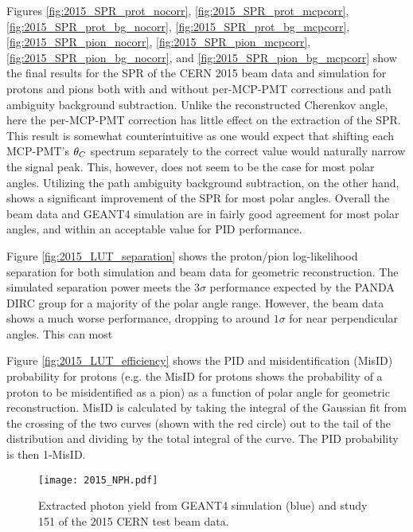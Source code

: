 Figures \ref{fig:2015_SPR_prot_nocorr}, \ref{fig:2015_SPR_prot_mcpcorr}, \ref{fig:2015_SPR_prot_bg_nocorr}, \ref{fig:2015_SPR_prot_bg_mcpcorr}, \ref{fig:2015_SPR_pion_nocorr}, \ref{fig:2015_SPR_pion_mcpcorr}, \ref{fig:2015_SPR_pion_bg_nocorr}, and \ref{fig:2015_SPR_pion_bg_mcpcorr} show the final results for the SPR of the CERN 2015 beam data and simulation for protons and pions both with and without per-MCP-PMT corrections and path ambiguity background subtraction. Unlike the reconstructed Cherenkov angle, here the per-MCP-PMT correction has little effect on the extraction of the SPR. This result is somewhat counterintuitive as one would expect that shifting each MCP-PMT's $\theta_{C}$ spectrum separately to the correct value would naturally narrow the signal peak. This, however, does not seem to be the case for most polar angles. Utilizing the path ambiguity background subtraction, on the other hand, shows a significant improvement of the SPR for most polar angles. Overall the beam data and GEANT4 simulation are in fairly good agreement for most polar angles, and within an acceptable value for PID performance.

Figure \ref{fig:2015_LUT_separation} shows the proton/pion log-likelihood separation for both simulation and beam data for geometric reconstruction. The simulated separation power meets the $3\sigma$ performance expected by the PANDA DIRC group for a majority of the polar angle range. However, the beam data shows a much worse performance, dropping to around $1\sigma$ for near perpendicular angles. This can most 

Figure \ref{fig:2015_LUT_efficiency} shows the PID and misidentification (MisID) probability for protons (e.g. the MisID for protons shows the probability of a proton to be misidentified as a pion) as a function of polar angle for geometric reconstruction. MisID is calculated by taking the integral of the Gaussian fit from the crossing of the two curves (shown with the red circle) out to the tail of the distribution and dividing by the total integral of the curve. The PID probability is then 1-MisID.

\begin{figure}[!htb]
	\centering
	\texttt{[image: 2015\_NPH.pdf]}
	\caption{Extracted photon yield from GEANT4 simulation (blue) and study 151 of the 2015 CERN test beam data.}
	\label{fig:2015_NPH}
\end{figure}

